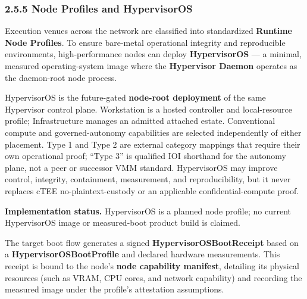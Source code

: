 \documentclass[
  11pt,
]{article}
\begin{document}
\hypertarget{node-profiles-and-hypervisoros}{%
\subsubsection{2.5.5 Node Profiles and
HypervisorOS}\label{node-profiles-and-hypervisoros}}

Execution venues across the network are classified into standardized
\textbf{Runtime Node Profiles}. To ensure bare-metal operational
integrity and reproducible environments, high-performance nodes can
deploy \textbf{HypervisorOS} --- a minimal, measured operating-system
image where the \textbf{Hypervisor Daemon} operates as the daemon-root
node process.

HypervisorOS is the future-gated \textbf{node-root deployment} of the same
Hypervisor control plane. Workstation is a hosted controller and local-resource
profile; Infrastructure manages an admitted attached estate. Conventional
compute and governed-autonomy capabilities are selected independently of
either placement. Type 1 and Type 2 are external category mappings that require
their own operational proof; ``Type 3'' is qualified IOI shorthand for the
autonomy plane, not a peer or successor VMM standard. HypervisorOS may improve
control, integrity, containment,
measurement, and reproducibility, but it never replaces cTEE
no-plaintext-custody or an applicable confidential-compute proof.

\textbf{Implementation status.} HypervisorOS is a planned node profile; no
current HypervisorOS image or measured-boot product build is claimed.

The target boot flow generates a signed
\textbf{HypervisorOSBootReceipt} based on a
\textbf{HypervisorOSBootProfile} and declared hardware measurements. This
receipt is bound
to the node's \textbf{node capability manifest}, detailing its physical
resources (such as VRAM, CPU cores, and network capability) and recording
the measured image under the profile's attestation assumptions.


\begin{center}
\end{center}
\end{document}
